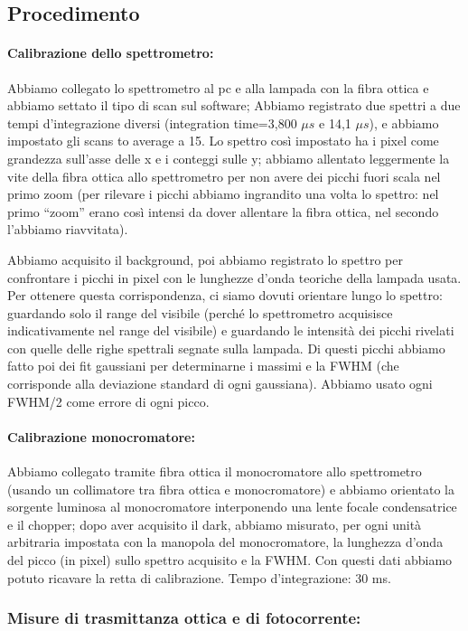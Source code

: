 \documentclass{article}
\begin{document}
\subsection{Procedimento}
\paragraph{Calibrazione dello spettrometro:}
Abbiamo collegato lo spettrometro al pc e alla lampada con la fibra ottica e abbiamo settato il tipo di scan sul software; Abbiamo registrato due spettri a due tempi d'integrazione diversi (integration time=3,800 $\mu s$ e 14,1 $\mu s$),  e abbiamo impostato gli scans to average a 15. Lo spettro così impostato ha i pixel come grandezza sull'asse delle x e i conteggi sulle y; abbiamo allentato leggermente la vite della fibra ottica allo spettrometro per non avere dei picchi fuori scala nel primo zoom (per rilevare i picchi abbiamo ingrandito una volta lo spettro: nel primo “zoom” erano così intensi da dover allentare la fibra ottica, nel secondo l'abbiamo riavvitata).

Abbiamo acquisito il background, poi abbiamo registrato lo spettro per confrontare i picchi in pixel con le lunghezze d'onda teoriche della lampada usata. Per ottenere questa corrispondenza, ci siamo dovuti orientare lungo lo spettro: guardando solo il range del visibile (perché lo spettrometro acquisisce indicativamente nel range del visibile) e guardando le intensità dei picchi rivelati con quelle delle righe spettrali segnate sulla lampada. Di questi picchi abbiamo fatto poi dei fit gaussiani per determinarne i massimi e la FWHM (che corrisponde alla deviazione standard di ogni gaussiana). Abbiamo usato ogni FWHM/2 come errore di ogni picco.
\paragraph{Calibrazione monocromatore:}
Abbiamo collegato tramite fibra ottica il monocromatore allo spettrometro (usando un collimatore tra fibra ottica e monocromatore) e abbiamo orientato la sorgente luminosa al monocromatore interponendo una lente focale condensatrice e il chopper; dopo aver acquisito il dark, abbiamo misurato, per ogni unità arbitraria impostata con la manopola del monocromatore, la lunghezza d'onda del picco (in pixel) sullo spettro acquisito e la FWHM. Con questi dati abbiamo potuto ricavare la retta di calibrazione.
\newline\newline
Tempo d'integrazione: 30 ms. 
\subsubsection{Misure di trasmittanza ottica e di fotocorrente:}
\end{document}
